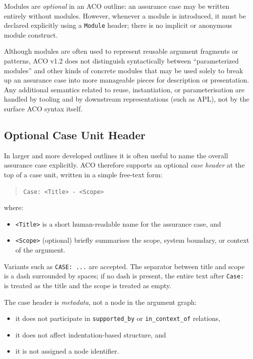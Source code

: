\documentclass[11pt]{article}
\begin{document}
Modules are \emph{optional} in an ACO outline: an assurance case may be written entirely
without modules. However, whenever a module is introduced, it must be declared explicitly
using a \texttt{Module} header; there is no implicit or anonymous module construct.

Although modules are often used to represent reusable argument fragments or patterns,
ACO v1.2 does not distinguish syntactically between ``parameterized modules'' and other kinds
of concrete modules that may be used solely to break up an assurance case into more manageable pieces for description or presentation. Any additional semantics related to reuse, instantiation, or parameterisation
are handled by tooling and by downstream representations (such as APL), not by the
surface ACO syntax itself.


\subsection{Optional Case Unit Header}

In larger and more developed outlines it is often useful to name the overall assurance case explicitly.
ACO therefore supports an optional \emph{case header} at the top of a case unit, written
in a simple free-text form:

\begin{quote}
\texttt{Case: \textless Title\textgreater{} - \textless Scope\textgreater}
\end{quote}

where:
\begin{itemize}[leftmargin=2em]
  \item \texttt{\textless Title\textgreater{}} is a short human-readable name for the assurance case, and
  \item \texttt{\textless Scope\textgreater{}} (optional) briefly summarises the scope, system boundary,
        or context of the argument.
\end{itemize}

Variants such as \texttt{CASE: ...} are accepted. The separator between title and scope
is a dash surrounded by spaces; if no dash is present, the entire text after
\texttt{Case:} is treated as the title and the scope is treated as empty.

The case header is \emph{metadata}, not a node in the argument graph:
\begin{itemize}[leftmargin=2em]
  \item it does not participate in \texttt{supported\_by} or \texttt{in\_context\_of} relations,
  \item it does not affect indentation-based structure, and
  \item it is not assigned a node identifier.
\end{itemize}
\end{document}
